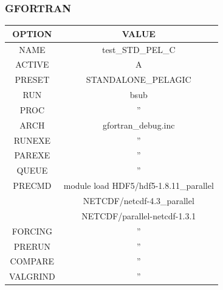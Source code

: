 \subsubsection{GFORTRAN}
\begin{tabular}{|c|c|}
\hline
\hline
\rowcolor{LightCyan}
{\bf OPTION}   & {\bf VALUE} \\
\hline    
NAME     & test\_STD\_PEL\_C \\
\hline    
ACTIVE   & A \\
\hline    
PRESET   & STANDALONE\_PELAGIC \\
\hline    
RUN      & bsub \\       
\hline    
PROC     & '' \\
\hline    
ARCH     & gfortran\_debug.inc \\
\hline    
RUNEXE   & '' \\
\hline    
PAREXE   & '' \\
\hline    
QUEUE    & '' \\
\hline    
PRECMD   & module load HDF5/hdf5-1.8.11\_parallel \\
         & NETCDF/netcdf-4.3\_parallel \\
         & NETCDF/parallel-netcdf-1.3.1 \\
\hline    
FORCING  & '' \\
\hline    
PRERUN   & '' \\
\hline    
COMPARE  & '' \\
\hline    
VALGRIND & '' \\
\hline        
\end{tabular}


